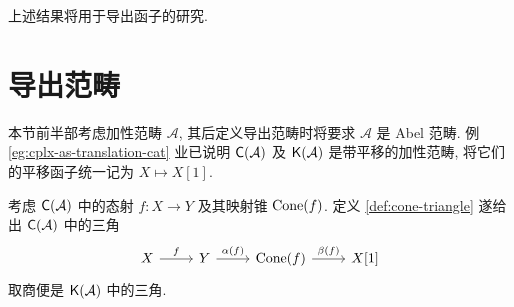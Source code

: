 上述结果将用于导出函子的研究.

\section{导出范畴}\label{sec:derived-cat}
本节前半部考虑加性范畴 $\mathcal{A}$, 其后定义导出范畴时将要求 $\mathcal{A}$ 是 Abel 范畴. 例 \ref{eg:cplx-as-translation-cat} 业已说明 $\mathsf{C}(\mathcal{A})$ 及 $\mathsf{K}(\mathcal{A})$ 是带平移的加性范畴, 将它们的平移函子统一记为 $X \mapsto X[1]$.

考虑 $\mathsf{C}(\mathcal{A})$ 中的态射 $f: X \to Y$ 及其映射锥 $\operatorname{Cone}(f)$. 定义 \ref{def:cone-triangle} 遂给出 $\mathsf{C}(\mathcal{A})$ 中的三角
\begin{equation}\label{eqn:Cone-triangle} \begin{tikzcd}
	X \arrow[r, "f"] & Y \arrow[r, "{\alpha(f)}"] & \Cone(f) \arrow[r, "\beta(f)"] & X[1]
\end{tikzcd}\end{equation}
取商便是 $\mathsf{K}(\mathcal{A})$ 中的三角.


